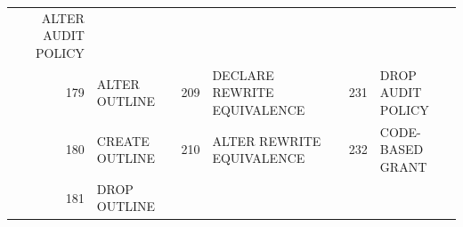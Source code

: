 \begin{appendix}
\begin{longtable}[]{@{}rl|rl|rl@{}}
\begin{minipage}[t]{0.24\columnwidth}
ALTER AUDIT POLICY\strut
\end{minipage}\tabularnewline
\begin{minipage}[t]{0.06\columnwidth}\raggedright\strut
179\strut
\end{minipage} & \begin{minipage}[t]{0.19\columnwidth}\raggedright\strut
ALTER OUTLINE\strut
\end{minipage} & \begin{minipage}[t]{0.06\columnwidth}\raggedright\strut
209\strut
\end{minipage} & \begin{minipage}[t]{0.24\columnwidth}\raggedright\strut
DECLARE REWRITE EQUIVALENCE\strut
\end{minipage} & \begin{minipage}[t]{0.06\columnwidth}\raggedright\strut
231\strut
\end{minipage} & \begin{minipage}[t]{0.24\columnwidth}\raggedright\strut
DROP AUDIT POLICY\strut
\end{minipage}\tabularnewline
\begin{minipage}[t]{0.06\columnwidth}\raggedright\strut
180\strut
\end{minipage} & \begin{minipage}[t]{0.19\columnwidth}\raggedright\strut
CREATE OUTLINE\strut
\end{minipage} & \begin{minipage}[t]{0.06\columnwidth}\raggedright\strut
210\strut
\end{minipage} & \begin{minipage}[t]{0.24\columnwidth}\raggedright\strut
ALTER REWRITE EQUIVALENCE\strut
\end{minipage} & \begin{minipage}[t]{0.06\columnwidth}\raggedright\strut
232\strut
\end{minipage} & \begin{minipage}[t]{0.24\columnwidth}\raggedright\strut
CODE-BASED GRANT\strut
\end{minipage}\tabularnewline
\begin{minipage}[t]{0.06\columnwidth}\raggedright\strut
181\strut
\end{minipage} & \begin{minipage}[t]{0.19\columnwidth}\raggedright\strut
DROP OUTLINE\strut
\end{minipage} & \begin{minipage}[t]{0.06\columnwidth}\raggedright\strut

\end{minipage}
\end{longtable}
\end{appendix}
